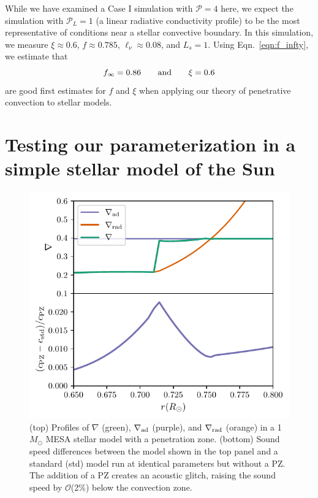 \documentclass[twocolumn, linenumbers]{aastex631}
\newcommand{\gradrad}{\ensuremath{\nabla_{\rm{rad}}}}
\newcommand{\gradad}{\ensuremath{\nabla_{\rm{ad}}}}
\newcommand{\justgrad}{\ensuremath{\nabla}}
\newcommand{\mP}{\ensuremath{\mathcal{P}}}
\begin{document}
While we have examined a Case I simulation with $\mP = 4$ here, we expect the simulation with $\mP_L = 1$ (a linear radiative conductivity profile) to be the most representative of conditions near a stellar convective boundary.
In this simulation, we measure $\xi \approx 0.6$, $f \approx 0.785$, $\ell_\nu \approx 0.08$, and $L_s = 1$.
Using Eqn.~\ref{eqn:f_infty}, we estimate that
\begin{equation}
f_\infty = 0.86\qquad\rm{and}\qquad
\xi = 0.6
\label{eqn:f_xi_estimates}
\end{equation}
are good first estimates for $f$ and $\xi$ when applying our theory of penetrative convection to stellar models.

\section{Testing our parameterization in a simple stellar model of the Sun}
\label{sec:solar_model}

\begin{figure}[t]
\centering
\includegraphics[width=\columnwidth]{mesa_profiles.pdf}
\caption{
(top) Profiles of $\justgrad$ (green), $\gradad$ (purple), and $\gradrad$ (orange) in a 1 $M_\odot$ MESA stellar model with a penetration zone.
(bottom) Sound speed differences between the model shown in the top panel and a standard (std) model run at identical parameters but without a PZ.
The addition of a PZ creates an acoustic glitch, raising the sound speed by $\mathcal{O}$(2\%) below the convection zone.
\label{fig:mesa_profiles}
}
\end{figure}
\end{document}
